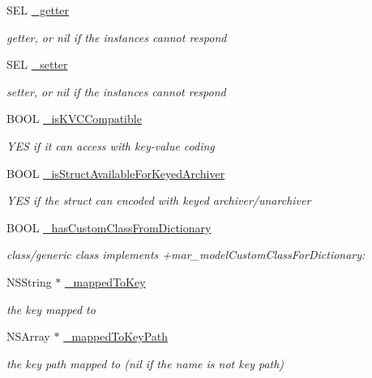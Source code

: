 \begin{DoxyCompactItemize}
S\+EL \hyperlink{interface___m_a_r_model_property_meta_a2463fd330968a48dda46f65413c98620}{\+\_\+getter}
\begin{DoxyCompactList}\small\item\em getter, or nil if the instances cannot respond \end{DoxyCompactList}\item 
S\+EL \hyperlink{interface___m_a_r_model_property_meta_aa6dce394928e972466274afc82b73624}{\+\_\+setter}
\begin{DoxyCompactList}\small\item\em setter, or nil if the instances cannot respond \end{DoxyCompactList}\item 
B\+O\+OL \hyperlink{interface___m_a_r_model_property_meta_abe14861cee2ed13a31b5e61f06b65dd6}{\+\_\+is\+K\+V\+C\+Compatible}
\begin{DoxyCompactList}\small\item\em Y\+ES if it can access with key-\/value coding \end{DoxyCompactList}\item 
B\+O\+OL \hyperlink{interface___m_a_r_model_property_meta_ac94dfbf993f518579b66afe1e179ffb5}{\+\_\+is\+Struct\+Available\+For\+Keyed\+Archiver}
\begin{DoxyCompactList}\small\item\em Y\+ES if the struct can encoded with keyed archiver/unarchiver \end{DoxyCompactList}\item 
B\+O\+OL \hyperlink{interface___m_a_r_model_property_meta_ae6a1b422e9ca964493b45321d51aef9a}{\+\_\+has\+Custom\+Class\+From\+Dictionary}
\begin{DoxyCompactList}\small\item\em class/generic class implements +mar\+\_\+model\+Custom\+Class\+For\+Dictionary\+: \end{DoxyCompactList}\item 
N\+S\+String $\ast$ \hyperlink{interface___m_a_r_model_property_meta_a56bebe33b976b23be1248ba9916c5724}{\+\_\+mapped\+To\+Key}
\begin{DoxyCompactList}\small\item\em the key mapped to \end{DoxyCompactList}\item 
N\+S\+Array $\ast$ \hyperlink{interface___m_a_r_model_property_meta_a87e2f339d3f2e94bbca4f8363dae83dd}{\+\_\+mapped\+To\+Key\+Path}
\begin{DoxyCompactList}\small\item\em the key path mapped to (nil if the name is not key path) \end{DoxyCompactList}\item 

\end{DoxyCompactItemize}
